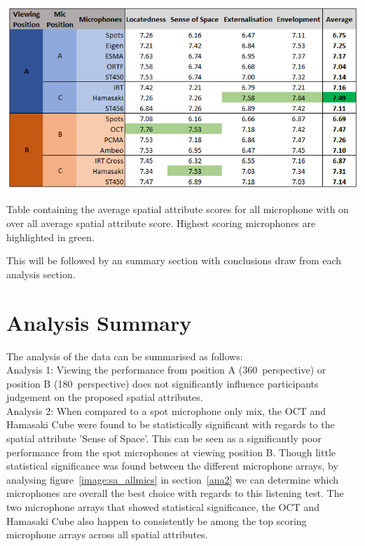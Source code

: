 	\begin{table}
	\begin{center}
		\includegraphics[width=\linewidth]{images/graphs/results_sum_graph_V3.PNG}
		\caption{Table containing the average spatial attribute scores for all microphone with on over all average spatial attribute score. Highest scoring microphones are highlighted in green.}
		\label{image:results_sum} 
	\end{center}
	\end{table}	

	This will be followed by an summary section with conclusions draw from each analysis section.

	
	
	
	
	
	

	\section{Analysis Summary}

		The analysis of the data can be summarised as follows:\\

		Analysis 1: Viewing the performance from position A (360\textdegree~perspective) or position B (180\textdegree~perspective) does not significantly influence participants judgement on the proposed spatial attributes. \\

		Analysis 2: When compared to a spot microphone only mix, the OCT and Hamasaki Cube were found to be statistically significant with regards to the spatial attribute 'Sense of Space'. This can be seen as a significantly poor performance from the spot microphones at viewing position B. Though little statistical significance was found between the different microphone arrays, by analysing figure~\ref{image:sa_allmics} in section~\ref{ana2} we can determine which microphones are overall the best choice with regards to this listening test. The two microphone arrays that showed statistical significance, the OCT and Hamasaki Cube also happen to consistently be among the top scoring microphone arrays across all spatial attributes. \\

